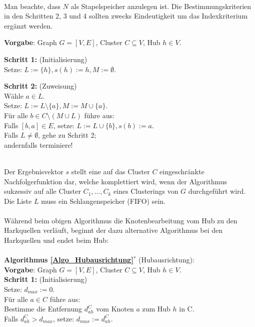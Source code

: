 \phantom \\
\noindent Man beachte, dass $N$ als Stapelspeicher anzulegen ist. Die Bestimmungskriterien in den Schritten 2, 3 und 4 sollten zwecks Eindeutigkeit um das Indexkriterium ergänzt werden.


\newpage
\begin{algo}[Hubausrichtung]
\label{Algo_Hubausrichtung}
\textbf{Vorgabe}: Graph $G=[V,E]$, Cluster $C \subseteq V$, Hub $h \in V$.

\noindent 
\textbf{Schritt 1:} (Initialisierung)\\
\phantom \quad Setze: $L := \{h\}, s(h) := h, M := \emptyset$.

\noindent 
\textbf{Schritt 2:} (Zuweisung)\\
\phantom \quad Wähle $a \in L$.\\
\phantom \quad Setze: $L := L\setminus \{a\}, M := M \cup \{a\}$.\\
\phantom \quad Für alle $b \in C\setminus (M \cup L)$ führe aus:\\ 
\phantom \quad \qquad Falls $[b,a] \in E$, setze: $L := L \cup \{b\}, s(b) := a$.\\
\phantom \quad Falls $L \neq \emptyset$, gehe zu Schritt 2;\\
\phantom \quad andernfalls terminiere!
\end{algo}

\phantom \\
\noindent Der Ergebnisvektor $s$ stellt eine auf das Cluster $C$ eingeschränkte Nachfolgerfunktion dar, welche komplettiert wird, wenn der Algorithmus sukzessiv auf alle Cluster $C_1,\dots,C_k$ eines Clusterings von $G$ durchgeführt wird. Die Liste $L$ muss ein Schlangenspeicher (FIFO) sein.\\
\\
Während beim obigen Algorithmus die Knotenbearbeitung vom Hub zu den Harkquellen verläuft, beginnt der dazu alternative Algorithmus bei den Harkquellen und endet beim Hub:\\
\\
\textbf{Algorithmus \ref{Algo_Hubausrichtung}$^*$} (Hubausrichtung):\\
\textbf{Vorgabe}: Graph $G=[V,E]$, Cluster $C \subseteq V$, Hub $h \in V$.\\
\textbf{Schritt 1:} (Initialisierung)\\
\phantom \quad Setze: $d_{max} := 0$.\\
\phantom \quad Für alle $a \in C$ führe aus:\\
\phantom \quad \qquad Bestimme die Entfernung $d^C_{ah}$ vom Knoten $a$ zum Hub $h$ in C.\\
\phantom \quad \qquad Falls $d^C_{ah} > d_{max}$, setze: $d_{max} := d^C_{ah}$.

